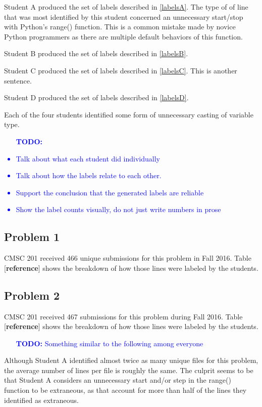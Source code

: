 

Student A produced the set of labels described in \ref{labelsA}. The type of of line that was most identified by this student concerned an unnecessary start/stop with Python's range() function. This is a common mistake made by novice Python programmers as there are multiple default behaviors of this function. 



Student B produced the set of labels described in \ref{labelsB}.



Student C produced the set of labels described in \ref{labelsC}. This is another sentence.



Student D produced the set of labels described in \ref{labelsD}.

Each of the four students identified some form of unnecessary casting of variable type.


\textcolor{blue}{
\begin{itemize}
    \itemsep-1.5em 
    \item [\textbf{TODO:}]
    \item Talk about what each student did individually
    \item Talk about how the labels relate to each other.
    \item Support the conclusion that the generated labels are reliable 
    \item Show the label counts visually, do not just write numbers in prose
\end{itemize}}

\subsection{Problem 1}
CMSC 201 received 466 unique submissions for this problem in Fall 2016. Table [\textbf{reference}] shows the breakdown of how those lines were labeled by the students. 

\subsection{Problem 2}
CMSC 201 received 467 submissions for this problem during Fall 2016. Table [\textbf{reference}] shows the breakdown of how those lines were labeled by the students.
\textcolor{blue}{
\begin{itemize}
    \itemsep-1.5em 
    \item [\textbf{TODO:}] Something similar to the following among everyone
\end{itemize}}
Although Student A identified almost twice as many unique files for this problem, the average number of lines per file is roughly the same. The culprit seems to be that Student A considers an unnecessary start and/or step in the range() function to be extraneous, as that account for more than half of the lines they identified as extraneous.

